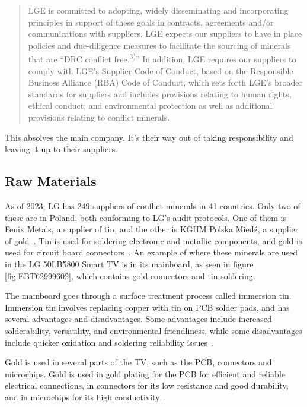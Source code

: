 \documentclass[12pt, letterpaper]{article}
\begin{document}
\begin{quote}
  LGE is committed to adopting, widely disseminating and incorporating
  principles in support of these goals in contracts, agreements and/or
  communications with suppliers. LGE expects our suppliers to have in
  place policies and due-diligence measures to facilitate the sourcing
of minerals that are ``DRC conflict free.\textsuperscript{3)}'' In
addition, LGE requires
our suppliers to comply with LGE's Supplier Code of Conduct, based on
the Responsible Business Alliance (RBA) Code of Conduct, which sets
forth LGE's broader standards for suppliers and includes provisions
relating to human rights, ethical conduct, and environmental
protection as well as additional provisions relating to conflict minerals.
\end{quote}

This absolves the main company. It's their way out of taking
responsibility and leaving it up to their suppliers.

\subsection{Raw Materials}

As of 2023, LG has 249 suppliers of conflict minerals in 41
countries. Only two of these are in Poland, both conforming to LG's
audit protocols. One of them is Fenix Metals, a supplier of tin, and
the other is KGHM Polska Mied\'z, a supplier of
gold~\autocite{lg-electronics-2023}. Tin is used for soldering
electronic and metallic components, and gold is used for circuit
board connectors~\autocite{brigham-2023}. An example of where these
minerals are used in the LG 50LB5800 Smart TV is in its mainboard, as
seen in figure \ref{fig:EBT62999602}, which contains gold connectors
and tin soldering.

The mainboard goes through a surface treatment process called
immersion tin. Immersion tin involves replacing copper with tin on
PCB solder pads, and has several advantages and disadvantages. Some
advantages include increased solderability, versatility, and
environmental friendliness, while some disadvantages include quicker
oxidation and soldering reliability issues~\autocite{jenell-2023}.

Gold is used in several parts of the TV, such as the PCB, connectors
and microchips. Gold is used in gold plating for the PCB for
efficient and reliable electrical connections, in connectors for its
low resistance and good durability, and in microchips for its high
conductivity~\autocite{elmore-2024}.
\end{document}
